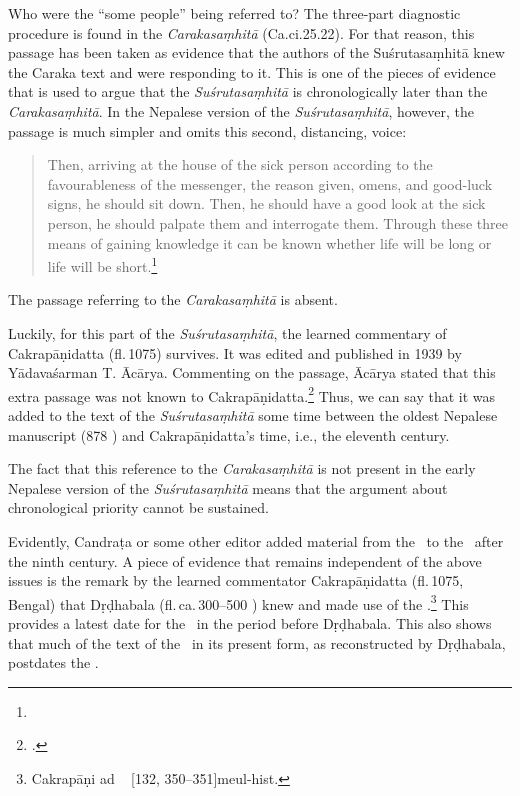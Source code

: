 Who were the “some people” being referred to? The three-part
diagnostic procedure is found in the \emph{Carakasaṃhitā}
(Ca.ci.25.22). For that reason, this passage has been taken as
evidence that the authors of the Suśrutasaṃhitā knew the Caraka text
and were responding to it. This is one of the pieces of evidence that
is used to argue that the \emph{Suśrutasaṃhitā} is chronologically
later than the \emph{Carakasaṃhitā}. In the Nepalese version of the
\emph{Suśrutasaṃhitā}, however, the passage is much simpler and omits
this second, distancing, voice:
\begin{quote}
    Then, arriving at the house of the sick person according to the favourableness of 
the messenger, the reason given, omens, and good-luck signs, he should sit down. 
Then, he should have a good look at the sick person, he should palpate them and 
interrogate them. Through these three means of gaining knowledge it can be 
known whether life will be long or life will be short.\footnote{}
\end{quote}
The passage referring to the \emph{Carakasaṃhitā} is absent.

Luckily, for this part of the \emph{Suśrutasaṃhitā}, the learned commentary of 
Cakrapāṇidatta (fl.\,1075) survives. It was edited and published in 1939 by 
Yādavaśarman T. Ācārya. Commenting on the passage, Ācārya stated that this 
extra passage was not known to Cakrapāṇidatta.\footnote{.}
Thus, we can say that it was added to the text of the
\emph{Suśrutasaṃhitā} some time between the oldest Nepalese manuscript
(878 \CE) and Cakrapāṇidatta’s time, i.e., the eleventh century.

The fact that this reference to the \emph{Carakasaṃhitā} is not
present in the early Nepalese version of the \emph{Suśrutasaṃhitā}
means that the argument about chronological priority cannot be
sustained.

Evidently, Candraṭa or some other editor added material from the
\CS\ to the \SS\ after the ninth century. A piece of evidence that
remains independent of the above issues is the remark by the
learned commentator Cakrapāṇidatta (fl.\,1075, Bengal) that
Dṛḍhabala (fl.\,ca.\,300--500 \CE) knew and made use of the
\SS.\footnote{Cakrapāṇi ad \CS\  [132, 350--351]{meul-hist}.}  This provides a latest date
    for the \SS\ in the period before Dṛḍhabala.  This also shows that
    much of the text of the \CS\ in its present form, as reconstructed
    by Dṛḍhabala, postdates the \SS.
   
